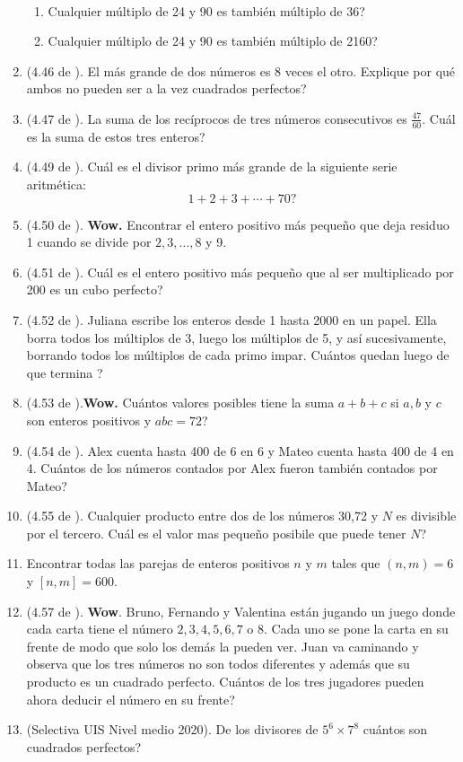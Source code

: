 \begin{exers}{\ \\}
\begin{enumerate}
\begin{enumerate}[label=\Alph*)]
							\item Cualquier múltiplo de 24 y 90 es también múltiplo de 36?
							\item Cualquier múltiplo de 24 y 90 es también múltiplo de 2160?																	
						\end{enumerate}
		\item (4.46 de \cite{Aops_TN}). El más grande de dos números es 8 veces el otro. Explique por qué ambos no pueden ser a la vez cuadrados perfectos?
		\item (4.47 de \cite{Aops_TN}). La suma de los recíprocos de tres números consecutivos es $\frac{47}{60}$. Cuál es la suma de estos tres enteros?
		\item (4.49 de \cite{Aops_TN}). Cuál es el divisor primo más grande de la siguiente serie aritmética:\[1+2+3+\cdots +70?\]
		\item (4.50 de \cite{Aops_TN}). \textbf{Wow.} Encontrar el entero positivo más pequeño que deja residuo 1 cuando se divide por $2,3,\dots,8$ y 9. 
		\item (4.51 de \cite{Aops_TN}). Cuál es el entero positivo más pequeño que al ser multiplicado por 200 es un cubo perfecto?
		\item (4.52 de \cite{Aops_TN}). Juliana escribe los enteros desde 1 hasta 2000 en un papel. Ella borra todos los múltiplos de 3, luego los múltiplos de 5, y así sucesivamente, borrando todos los múltiplos de cada primo impar. Cuántos quedan luego de que termina ?
		\item (4.53 de \cite{Aops_TN}).\textbf{Wow. }Cuántos valores posibles tiene la suma $a+b+c$ si $a,b$ y $c$ son enteros positivos y $abc=72$?
		\item (4.54 de \cite{Aops_TN}). Alex cuenta hasta 400 de 6 en 6 y Mateo cuenta hasta 400 de 4 en 4. Cuántos de los números contados por Alex fueron también contados por Mateo?
		\item (4.55 de \cite{Aops_TN}). Cualquier producto entre dos de los números 30,72 y $N$ es divisible por el tercero. Cuál es el valor mas pequeño posibile que puede tener $N$?
		\item Encontrar todas las parejas de enteros positivos $n$ y $m$ tales que $(n,m)=6$ y $[n,m]=600$.
		
		\item (4.57 de \cite{Aops_TN}). \textbf{Wow}. Bruno, Fernando y Valentina están jugando un juego donde cada carta tiene el número $2,3,4,5,6,7$ o 8. Cada uno se pone la carta en su frente de modo que solo los demás la pueden ver. Juan va caminando y observa que los tres números no son todos diferentes y además que su producto es un cuadrado perfecto. Cuántos de los tres jugadores pueden ahora deducir el número en su frente? 
		
		\item (Selectiva UIS Nivel medio 2020). De los divisores de $5^6\times 7^8$ cuántos son cuadrados perfectos?
		
	\end{enumerate}
\end{exers}
\newpage

